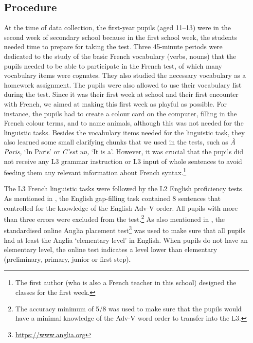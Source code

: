 \documentclass[output=paper,modfonts,nonflat, newtxmath]{langsci/langscibook}
\begin{document}
\subsection{{Procedure}}
\label{sec:stadt:3.4}

At the time of data collection, the first-year pupils (aged 11–13) were in the second week of secondary school because in the first school week, the students needed time to prepare for taking the test. Three 45-minute periods were dedicated to the study of the basic French vocabulary (verbs, nouns) that the pupils needed to be able to participate in the French test, of which many vocabulary items were cognates. They also studied the necessary vocabulary as a homework assignment. The pupils were also allowed to use their vocabulary list during the test. Since it was their first week at school and their first encounter with French, we aimed at making this first week as playful as possible. For instance, the pupils had to create a colour card on the computer, filling in the French colour terms, and to name animals, although this was not needed for the linguistic tasks. Besides the vocabulary items needed for the linguistic task, they also learned some small clarifying chunks that we used in the tests, such as \textit{À} \textit{Paris,} ‘In Paris’ or \textit{C’est} \textit{un,} ‘It is a’. However, it was crucial that the pupils did not receive any L3 grammar instruction or L3 input of whole sentences to avoid feeding them any relevant information about French syntax.\footnote{ \textrm{The first author (who is also a French teacher in this school) designed the classes for the first week.} }

The L3 French linguistic tasks were followed by the L2 English proficiency tests. As mentioned in , the English gap-filling task contained 8 sentences that controlled for the knowledge of the English Adv-V order. All pupils with more than three errors were excluded from the test.\footnote{ \textrm{The accuracy minimum of 5/8 was used to make sure that the pupils would have a minimal knowledge of the Adv-V word order to transfer into the L3.} } As also mentioned in , the standardised online Anglia placement test\footnote{\url{https://www.anglia.org}} was used to make sure that all pupils had at least the Anglia ‘elementary level’ in English. When pupils do not have an elementary level, the online test indicates a level lower than elementary (preliminary, primary, junior or first step).
\end{document}
